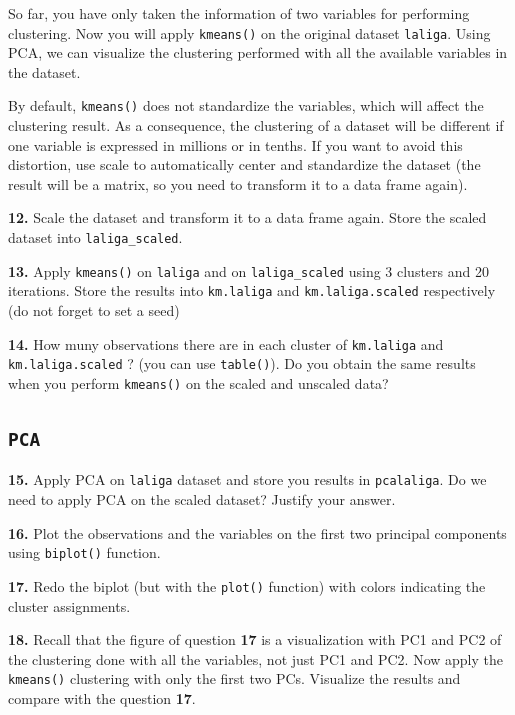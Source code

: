 \documentclass[]{book}
\begin{document}
So far, you have only taken the information of two variables for
performing clustering. Now you will apply \texttt{kmeans()} on the
original dataset \texttt{laliga}. Using PCA, we can visualize the
clustering performed with all the available variables in the dataset.

By default, \texttt{kmeans()} does not standardize the variables, which
will affect the clustering result. As a consequence, the clustering of a
dataset will be different if one variable is expressed in millions or in
tenths. If you want to avoid this distortion, use scale to automatically
center and standardize the dataset (the result will be a matrix, so you
need to transform it to a data frame again).

\textbf{12.} Scale the dataset and transform it to a data frame again.
Store the scaled dataset into \texttt{laliga\_scaled}.

\textbf{13.} Apply \texttt{kmeans()} on \texttt{laliga} and on
\texttt{laliga\_scaled} using 3 clusters and 20 iterations. Store the
results into \texttt{km.laliga} and \texttt{km.laliga.scaled}
respectively (do not forget to set a seed)

\textbf{14.} How muny observations there are in each cluster of
\texttt{km.laliga} and \texttt{km.laliga.scaled} ? (you can use
\texttt{table()}). Do you obtain the same results when you perform
\texttt{kmeans()} on the scaled and unscaled data?

\subsection*{\texorpdfstring{\texttt{PCA}}{PCA}}\label{pca}

\textbf{15.} Apply PCA on \texttt{laliga} dataset and store you results
in \texttt{pcalaliga}. Do we need to apply PCA on the scaled dataset?
Justify your answer.

\textbf{16.} Plot the observations and the variables on the first two
principal components using \texttt{biplot()} function.

\textbf{17.} Redo the biplot (but with the \texttt{plot()} function)
with colors indicating the cluster assignments.

\textbf{18.} Recall that the figure of question \textbf{17} is a
visualization with PC1 and PC2 of the clustering done with all the
variables, not just PC1 and PC2. Now apply the \texttt{kmeans()}
clustering with only the first two PCs. Visualize the results and
compare with the question \textbf{17}.
\end{document}
